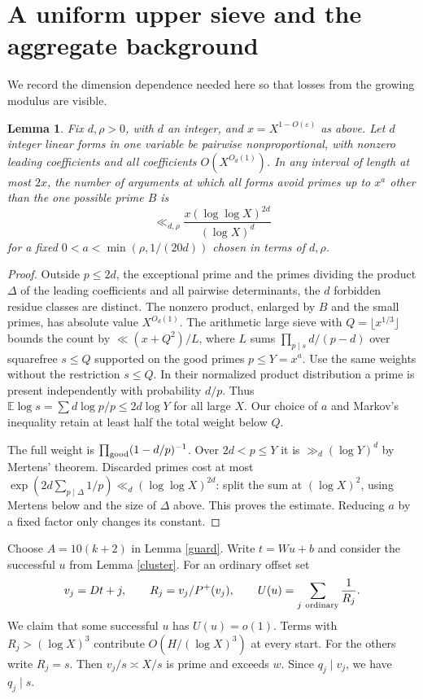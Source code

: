\documentclass[10pt]{article}
\newtheorem{lemma}[theorem]{Lemma}
\newcommand{\eps}{\varepsilon}
\begin{document}
\section{A uniform upper sieve and the aggregate background}
We record the dimension dependence needed here so that losses from the growing modulus are visible.

\begin{lemma}\label{upper}
Fix $d,\rho>0$, with $d$ an integer, and $x=X^{1-O(\eps)}$ as above. Let $d$ integer linear forms in one variable be pairwise nonproportional, with nonzero leading coefficients and all coefficients $O(X^{O_d(1)})$. In any interval of length at most $2x$, the number of arguments at which all forms avoid primes up to $x^a$ other than the one possible prime $B$ is
\[
 \ll_{d,\rho} \frac{x(\log\log X)^{2d}}{(\log X)^d}
\]
for a fixed $0<a<\min(\rho,1/(20d))$ chosen in terms of $d,\rho$.
\end{lemma}
\begin{proof}
Outside $p\le2d$, the exceptional prime and the primes dividing the product $\Delta$ of the leading coefficients and all pairwise determinants, the $d$ forbidden residue classes are distinct. The nonzero product, enlarged by $B$ and the small primes, has absolute value $X^{O_d(1)}$. The arithmetic large sieve \cite{Kow} with $Q=\lfloor x^{1/3}\rfloor$ bounds the count by $\ll(x+Q^2)/L$, where $L$ sums $\prod_{p\mid s}d/(p-d)$ over squarefree $s\le Q$ supported on the good primes $p\le Y=x^a$. Use the same weights without the restriction $s\le Q$. In their normalized product distribution a prime is present independently with probability $d/p$. Thus $\mathbb E\log s=\sum d\log p/p\le2d\log Y$ for all large $X$. Our choice of $a$ and Markov's inequality retain at least half the total weight below $Q$.

The full weight is $\prod_{\rm good}(1-d/p)^{-1}$. Over $2d<p\le Y$ it is $\gg_d(\log Y)^d$ by Mertens' theorem. Discarded primes cost at most $\exp(2d\sum_{p\mid\Delta}1/p)\ll_d(\log\log X)^{2d}$: split the sum at $(\log X)^2$, using Mertens below and the size of $\Delta$ above. This proves the estimate. Reducing $a$ by a fixed factor only changes its constant.
\end{proof}

Choose $A=10(k+2)$ in Lemma \ref{guard}. Write $t=Wu+b$ and consider the successful $u$ from Lemma \ref{cluster}. For an ordinary offset set
\[
 v_j=Dt+j,\qquad R_j=v_j/P^+(v_j),\qquad
 U(u)=\sum_{j\ {\rm ordinary}}\frac1{R_j}.
\]
We claim that some successful $u$ has $U(u)=o(1)$. Terms with $R_j>(\log X)^3$ contribute $O(H/(\log X)^3)$ at every start. For the others write $R_j=s$. Then $v_j/s\asymp X/s$ is prime and exceeds $w$. Since $q_j\mid v_j$, we have $q_j\mid s$.
\end{document}
